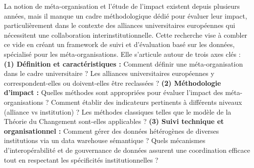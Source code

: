 La notion de méta-organisation et l'étude de l'impact existent depuis plusieurs années, mais il manque un cadre méthodologique dédié pour évaluer leur impact, particulièrement dans le contexte des alliances universitaires européennes qui nécessitent une collaboration interinstitutionnelle. Cette recherche vise à combler ce vide en créant un framework de suivi et d'évaluation basé sur les données, spécialisé pour les méta-organisations. Elle s'articule autour de trois axes clés :
\textbf{(1) Définition et caractéristiques :} Comment définir une méta-organisation dans le cadre universitaire ? Les alliances universitaires européennes y correspondent-elles ou doivent-elles être reclassées ?
\textbf{(2) Méthodologie d'impact :} Quelles méthodes sont appropriées pour évaluer l'impact des méta-organisations ? Comment établir des indicateurs pertinents à différents niveaux (alliance vs institution) ? Les méthodes classiques telles que le modèle de la Théorie du Changement sont-elles applicables ?
\textbf{(3) Suivi technique et organisationnel :} Comment gérer des données hétérogènes de diverses institutions via un data warehouse sémantique ? Quels mécanismes d'interopérabilité et de gouvernance de données assurent une coordination efficace tout en respectant les spécificités institutionnelles ?